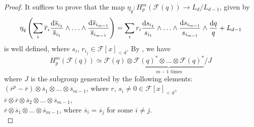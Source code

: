 \documentclass[times,10pt]{amsart}
\newcommand{\dd}{{\rm d}}
\newcommand{\F}{\ensuremath{\mathcal{F}}}
\renewcommand{\cong}{\simeq}
\begin{document}
      \begin{proof}
          It suffices to prove that the map $ \eta_q: H_p^m(\F(q))\xrightarrow{} L_d/ L_{d-1}$,  given  by $$  \eta_q\left( \sum_{i}\overline{r}_i\frac{\dd \overline{s}_{i_1}}{\overline{s}_{i_1}}\wedge\ldots\wedge\frac{\dd \overline{s}_{i_{m-1}}}{\overline{s}_{i_{m-1}}}\right)=\sum_{i}  r_i \frac{\dd s_{i_1}}{s_{i_1}}\wedge \ldots\wedge \frac{\dd s_{i_{m-1}}}{s_{i_{m-1}}}\wedge \frac{\dd q}{q}+L_{d-1} $$ is well defined, where $s_i$, $r_{i_j}\in \F[x]_{<d}$. By \cite[Lemma 4.4]{ex},    we have $$H_p^m(\F(q)) \cong \F(q)\otimes \underbrace{\F(q)^{*}\otimes\ldots\otimes \F(q)^*}_{m-1 \text{ times}}/J$$ where $J$ is the subgroup generated by the following elements:    \\
          
           $ ( \overline{r}^p- \overline{r}) \otimes \overline{s}_1\otimes\ldots\otimes \overline{s}_{m-1}$, where $r$, $s_i\neq 0\in \F[x]_{< d}$,\\

           $\overline{r}\otimes \overline{r}\otimes \overline{s}_2\otimes \ldots\otimes \overline{s}_{m-1}$,\\

           $ \overline{r} \otimes \overline{s}_1\otimes \ldots\otimes \overline{s}_{m-1}$, where $\overline{s}_i= \overline{s}_j$ for some $i\neq j$.\\


\end{proof}
\end{document}
